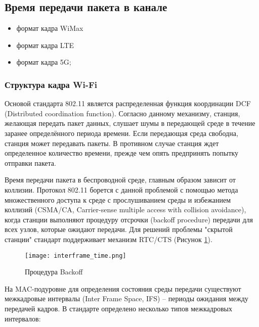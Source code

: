 \subsection{Время передачи пакета в канале}
\begin{itemize}
  \item формат кадра WiMax
  \item формат кадра LTE
  \item формат кадра 5G;
\end{itemize}


\subsubsection{Структура кадра Wi-Fi}
 Основой стандарта 802.11 является распределенная функция координации DCF (Distributed coordination function). Согласно данному механизму, станция, желающая передать пакет данных, слушает шумы в передающей среде в течение заранее определённого периода времени. Если передающая среда свободна, станция может передавать пакеты. В противном случае станция ждет определенное количество времени, прежде чем опять предпринять попытку отправки пакета.

 Время передачи пакета в беспроводной среде, главным образом зависит от коллизии. Протокол 802.11 борется с данной проблемой с помощью метода множественного доступа к среде с прослушиванием среды и избежанием коллизий (CSMA/CA, Carrier-sense multiple access with collision avoidance), когда станции выполняют процедуру отсрочки (backoff procedure) передачи для всех узлов, которые ожидают передачи. Для решений проблемы "скрытой станции" стандарт поддерживает механизм RTC/CTS (Рисунок \cref{fig:part1_interframe_time}).

\begin{figure}[h!]
  \centering
   \texttt{[image: interframe\_time.png]}
\caption{Процедура Backoff}
\label{fig:part1_interframe_time}
\end{figure}

На MAC-подуровне  для определения состояния среды передачи существуют межкадровые интервалы (Inter Frame Space, IFS) -- периоды ожидания между передачей кадров. В стандарте определено несколько типов межкадровых интервалов:

